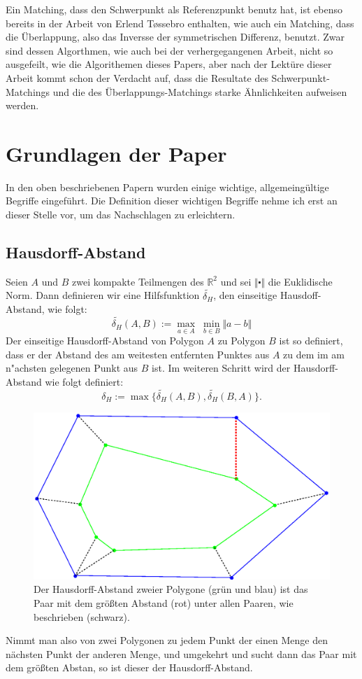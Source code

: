 Ein Matching, dass den Schwerpunkt als Referenzpunkt benutz hat, ist ebenso bereits in der Arbeit von Erlend T\o{}ssebro enthalten, wie auch ein Matching, dass die Überlappung, also das Inversse der symmetrischen Differenz, benutzt. Zwar sind dessen Algorthmen, wie auch bei der verhergegangenen Arbeit, nicht so ausgefeilt, wie die Algorithemen dieses Papers, aber nach der Lektüre dieser Arbeit kommt schon der Verdacht auf, dass die Resultate des Schwerpunkt-Matchings und die des Überlappungs-Matchings starke Ähnlichkeiten aufweisen werden. 

\section{Grundlagen der Paper}
In den oben beschriebenen Papern wurden einige wichtige, allgemeingültige Begriffe eingeführt. Die Definition dieser wichtigen Begriffe nehme ich erst an dieser Stelle vor, um das Nachschlagen zu erleichtern.

\subsection{Hausdorff-Abstand}\label{Hausdorff} 

Seien $A$ und $B$ zwei kompakte Teilmengen des $\mathbb{R}^2$ und sei $\Vert\centerdot\Vert$ die Euklidische Norm.
Dann definieren wir eine Hilfsfunktion $ \widetilde{\delta_H}  $, den einseitige Hausdoff-Abstand, wie folgt:
\[ \widetilde{\delta_H}(A,B):=\max_{a\in A} \;\min_{b\in B} \Vert a-b \Vert\]
Der einseitige Hausdorff-Abstand von Polygon $A$ zu Polygon $B$ ist so definiert, dass er der Abstand des am weitesten entfernten Punktes aus $A$ zu dem im am n"achsten gelegenen Punkt aus $B$ ist.  Im weiteren Schritt wird der Hausdorff-Abstand wie folgt definiert: 
\[\delta_H:=\max\{\widetilde{\delta_H}(A,B),\widetilde{\delta_H}(B,A)\}.\]
\begin{figure}
	\centering
	\includegraphics[scale=.6]{Hausdorff.eps}
	\caption[Der Hausdorff-Abstand zweier Polygone]{Der Hausdorff-Abstand zweier Polygone (grün und blau) ist das Paar mit dem größten Abstand (rot) unter allen Paaren, wie beschrieben (schwarz).}
	\label{fig:HausdorffAbstand}
\end{figure}
Nimmt man also von zwei Polygonen zu jedem Punkt der einen Menge den nächsten Punkt der anderen Menge, und umgekehrt und sucht dann das Paar mit dem größten Abstan, so ist dieser der Hausdorff-Abstand.



